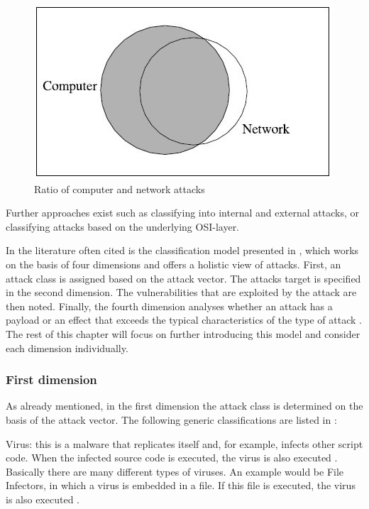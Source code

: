 \documentclass[conference]{IEEEtran}
\begin{document}
\begin{figure}[htbp]  
\centerline{\includegraphics{computer-network-attacks.jpg}}
\caption{Ratio of computer and network attacks \cite{b2}}
\end{figure}

\medskip Further approaches exist such as classifying into internal and external attacks, or classifying attacks based on the underlying OSI-layer.

\medskip In the literature often cited is the classification model presented in \cite{b5}, which works on the basis of four dimensions and offers a holistic view of attacks. First, an attack class is assigned based on the attack vector. The attacks target is specified in the second dimension. The vulnerabilities that are exploited by the attack are then noted. Finally, the fourth dimension analyses whether an attack has a payload or an effect that exceeds the typical characteristics of the type of attack \cite{b5} . The rest of this chapter will focus on further introducing this model and consider each dimension individually.

\subsubsection{First dimension}

\medskip As already mentioned, in the first dimension the attack class is determined on the basis of the attack vector. The following generic classifications are listed in \cite{b5}:

\smallskip Virus: this is a malware that replicates itself and, for example, infects other script code. When the infected source code is executed, the virus is also executed \cite{b6}.  Basically there are many different types of viruses. An example would be File Infectors, in which a virus is embedded in a file. If this file is executed, the virus is also executed \cite{b2}.
\end{document}
